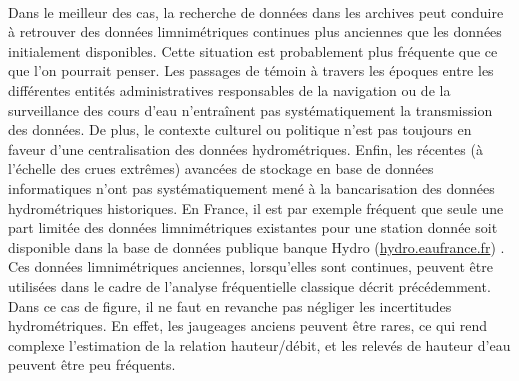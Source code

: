 \documentclass[11pt]{article}
\begin{document}
	\paragraph{} Dans le meilleur des cas, la recherche de données dans les archives peut conduire à retrouver des données limnimétriques continues plus anciennes que les données initialement disponibles. Cette situation est probablement plus fréquente que ce que l'on pourrait penser. Les passages de témoin à travers les époques entre les différentes entités administratives responsables de la navigation ou de la surveillance des cours d'eau n'entraînent pas systématiquement la transmission des données. De plus, le contexte culturel ou politique n'est pas toujours en faveur d'une centralisation des données hydrométriques. Enfin, les récentes (à l'échelle des crues extrêmes) avancées de stockage en base de données informatiques n'ont pas systématiquement mené à la bancarisation des données hydrométriques historiques. En France, il est par exemple fréquent que seule une part limitée des données limnimétriques existantes pour une station donnée soit disponible dans la base de données publique banque Hydro (\url{hydro.eaufrance.fr}) \citep{le_gros_les_2015}. Ces données limnimétriques anciennes, lorsqu'elles sont continues, peuvent être utilisées dans le cadre de l'analyse fréquentielle classique décrit précédemment. Dans ce cas de figure, il ne faut en revanche pas négliger les incertitudes hydrométriques. En effet, les jaugeages anciens peuvent être rares, ce qui rend complexe l'estimation de la relation hauteur/débit, et les relevés de hauteur d'eau peuvent être peu fréquents.
	
\end{document}
